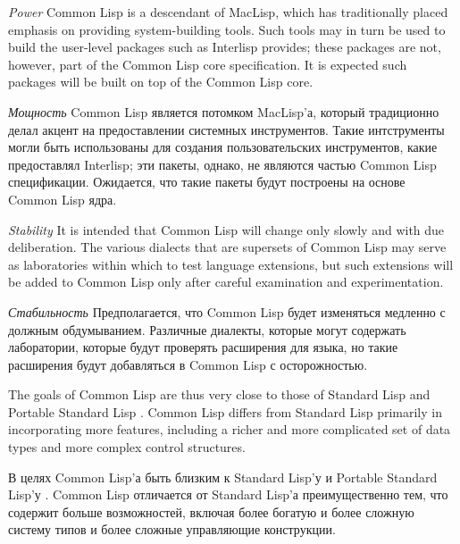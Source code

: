 \begin{flushdesc}
\item[\textit{Power}]
Common Lisp is a descendant of MacLisp, which has
traditionally placed emphasis on providing system-building tools.
Such tools may in turn be used to build the user-level packages
such as Interlisp provides; these packages are not, however, part
of the Common Lisp core specification.  It is expected such packages will
be built on top of the Common Lisp core.

\item[\textit{Мощность}]
Common Lisp является потомком MacLisp'а, который традиционно делал
акцент на предоставлении системных инструментов. Такие интструменты
могли быть использованы для создания пользовательских
инструментов, какие предоставлял Interlisp; эти пакеты, однако, не
являются частью Common Lisp спецификации. Ожидается, что
такие пакеты будут построены на основе Common Lisp ядра.

\item[\textit{Stability}]
It is intended that Common Lisp
will change only slowly and with due deliberation.  The various dialects
that are supersets of Common Lisp may serve as laboratories within which to
test language extensions, but such extensions will be added to
Common Lisp only after careful examination and experimentation.

\item[\textit{Стабильность}]
Предполагается, что Common Lisp будет изменяться медленно с
должным обдумыванием. Различные диалекты, которые могут содержать
лаборатории, которые будут проверять расширения для языка, но
такие расширения будут добавляться в Common Lisp с осторожностью.
\end{flushdesc}


The goals of Common Lisp are thus very close to those of Standard Lisp
\cite{STANDARD-LISP-REPORT} and Portable Standard Lisp \cite{PSL-MANUAL}.
Common Lisp differs from Standard Lisp
primarily in incorporating more features, including a
richer and more complicated set of data types and more complex
control structures.

В целях Common Lisp'а быть близким к Standard Lisp'у \cite{STANDARD-LISP-REPORT}
и Portable Standard Lisp'у \cite{PSL-MANUAL}. Common Lisp отличается от Standard
Lisp'а преимущественно тем, что содержит больше возможностей, включая более
богатую и более сложную систему типов и более сложные управляющие конструкции. 

